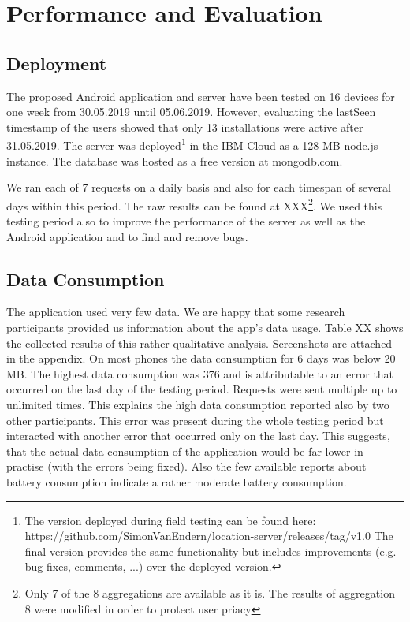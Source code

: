 \chapter{Performance and Evaluation}\label{chapter:performance}
\section{Deployment}
The proposed Android application and server have been tested on 16 devices for one week from 30.05.2019 until 05.06.2019. However, evaluating the lastSeen timestamp of the users showed that only 13 installations were active after 31.05.2019. The server was deployed\footnote{The version deployed during field testing can be found here: https://github.com/SimonVanEndern/location-server/releases/tag/v1.0 The final version provides the same functionality but includes improvements (e.g. bug-fixes, comments, ...) over the deployed version.} in the IBM Cloud as a 128 MB node.js instance. The database was hosted as a free version at mongodb.com.

We ran each of 7 requests on a daily basis and also for each timespan of several days within this period. The raw results can be found at XXX\footnote{Only 7 of the 8 aggregations are available as it is. The results of aggregation 8 were modified in order to protect user priacy}. We used this testing period also to improve the performance of the server as well as the Android application and to find and remove bugs.

\section{Data Consumption}
The application used very few data. We are happy that some research participants provided us information about the app's data usage. Table XX shows the collected results of this rather qualitative analysis. Screenshots are attached in the appendix. On most phones the data consumption for 6 days was below 20 MB. The highest data consumption was 376 and is attributable to an error that occurred on the last day of the testing period. Requests were sent multiple up to unlimited times. This explains the high data consumption reported also by two other participants. This error was present during the whole testing period but interacted with another error that occurred only on the last day. This suggests, that the actual data consumption of the application would be far lower in practise (with the errors being fixed).
Also the few available reports about battery consumption indicate a rather moderate battery consumption.

